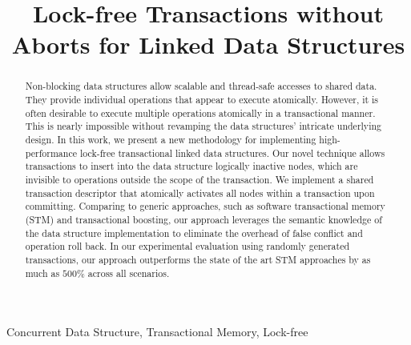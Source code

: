 \documentclass[10pt,conference,compsocconf]{IEEEtran}
\begin{document}
\title{Lock-free Transactions without Aborts for Linked Data Structures}

\author{
}

\maketitle

\begin{abstract}
    Non-blocking data structures allow scalable and thread-safe accesses to shared data. 
    They provide individual operations that appear to execute atomically.
    However, it is often desirable to execute multiple operations atomically in a transactional manner.
    This is nearly impossible without revamping the data structures' intricate underlying design.
    In this work, we present a new methodology for implementing high-performance lock-free transactional linked data structures.
    Our novel technique allows transactions to insert into the data structure logically inactive nodes, which are invisible to operations outside the scope of the transaction.
    We implement a shared transaction descriptor that atomically activates all nodes within a transaction upon committing.
    Comparing to generic approaches, such as software transactional memory (STM) and transactional boosting, our approach leverages the semantic knowledge of the data structure implementation to eliminate the overhead of false conflict and operation roll back.
    In our experimental evaluation using randomly generated transactions, our approach outperforms the state of the art STM approaches by as much as $500\%$ across all scenarios.
\end{abstract}

\begin{IEEEkeywords}
    Concurrent Data Structure, Transactional Memory, Lock-free 
\end{IEEEkeywords}

\end{document}
